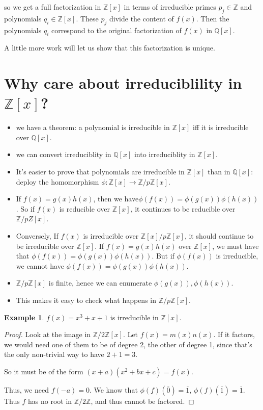 \documentclass{book}
\newcommand{\Z}{\ensuremath{\mathbb{Z}}}
\newcommand{\Q}{\ensuremath{\mathbb{Q}}}
\theoremstyle{definition}
\newtheorem{example}[theorem]{Example}
\begin{document}
so we get a full factorization in $\Z[x]$ in terms of irreducible primes
$p_j \in \Z$ and polynomials $q_i \in \Z[x]$. These $p_j$ divide the content
of $f(x)$. Then the polynomials $q_i$ correspond to the original factorization
of $f(x)$ in $\Q[x]$.

A little more work will let us show that this factorization is unique.

\section{Why care about irreduciblility in $\Z[x]$?}
\begin{itemize}
\item we have a theorem: a polynomial is irreducible in $\Z[x]$ iff it
is irreducible over $\Q[x]$.

\item we can convert irreduciblity in $\Q[x]$ into irreduciblity in $\Z[x]$.
\item It's easier to prove that polynomials are irreducible in $\Z[x]$ than in $\Q[x]$:
    deploy the homomorphism $\phi: \Z[x] \rightarrow \Z/p\Z[x]$.
\item If $f(x) = g(x)h(x)$, then we have$\phi(f(x)) = \phi(g(x)) \phi(h(x))$.
      So if $f(x)$ is reducible over $\Z[x]$, it continues to be reducible
        over $\Z/pZ[x]$.
\item Conversely, If $f(x)$ is irreducible over $\Z[x]/p\Z[x]$, it should continue to be
    irreducible over $\Z[x]$. If $f(x) = g(x) h(x)$ over $\Z[x]$, we must have
        that $\phi(f(x)) = \phi(g(x))\phi(h(x))$. But if $\phi(f(x))$ is irreducible,
        we cannot have $\phi(f(x)) = \phi(g(x)) \phi(h(x))$.
\item $\Z/p\Z[x]$ is finite, hence we can enumerate $\phi(g(x)), \phi(h(x))$.
\item This makes it easy to check what happens in $\Z/p\Z[x]$.
\end{itemize}

\begin{example}
    $f(x) = x^3 + x + 1$ is irreducible in $\Z[x]$.
\end{example}
\begin{proof}
    Look at the image in $\Z/2\Z[x]$. Let $f(x) = m(x) n(x)$. If it factors,
    we would need one of them to be of degree 2, the other of degree 1,
    since that's the only non-trivial way to have $2 + 1 = 3$.

    So it must be of the form $(x + a)(x^2 + bx + c) = f(x)$.

    Thus, we need $f(-a) = 0$. We know that
    $\phi(f)(\overline 0) = \overline 1$,
    $\phi(f)(\overline 1) = \overline 1$.
    Thus $f$ has no root in $\Z/2\Z$, and thus cannot be factored.
\end{proof}
\end{document}
